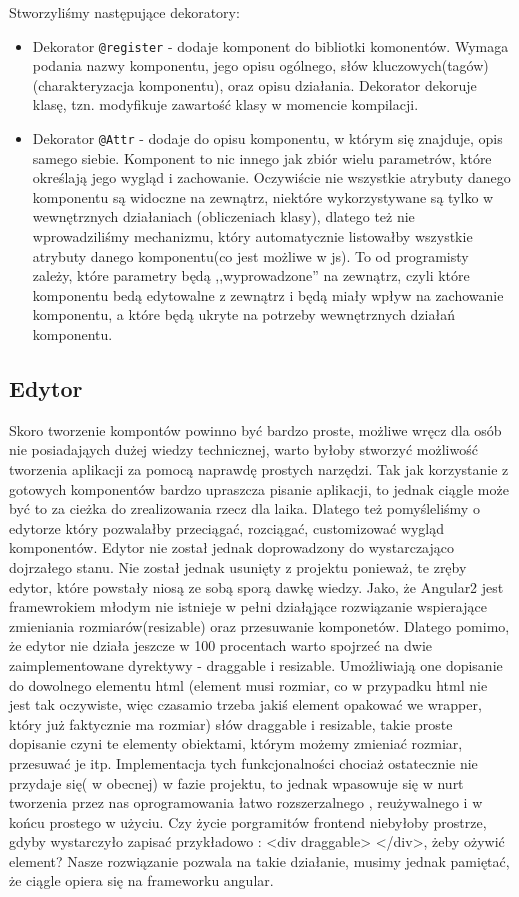\documentclass[licencjacka]{pracamgr}
\begin{document}
Stworzyliśmy następujące dekoratory:
\begin{itemize}
	\item Dekorator \texttt{@register} - dodaje komponent do bibliotki komonentów. Wymaga podania nazwy komponentu,
jego opisu ogólnego, słów kluczowych(tagów) (charakteryzacja komponentu),
oraz opisu działania. Dekorator dekoruje klasę, tzn. modyfikuje zawartość
klasy w momencie kompilacji.

	\item Dekorator \texttt{@Attr} - dodaje do opisu komponentu, w którym się znajduje, opis samego siebie.
Komponent to nic innego jak zbiór wielu parametrów, które określają jego wygląd i zachowanie.
Oczywiście nie wszystkie atrybuty danego komponentu są widoczne na zewnątrz, niektóre wykorzystywane
są tylko w wewnętrznych działaniach (obliczeniach klasy), dlatego też nie wprowadziliśmy mechanizmu, który
automatycznie listowałby wszystkie atrybuty danego komponentu(co jest możliwe w js). To od programisty
zależy, które parametry będą ,,wyprowadzone'' na zewnątrz, czyli które komponentu bedą edytowalne z zewnątrz
i będą miały wpływ na zachowanie komponentu, a które będą ukryte na potrzeby wewnętrznych działań komponentu.
\end{itemize}

\subsection{Edytor}
Skoro tworzenie kompontów powinno być bardzo proste, możliwe wręcz dla osób nie posiadająych dużej wiedzy technicznej, warto byłoby
stworzyć możliwość tworzenia aplikacji za pomocą naprawdę prostych narzędzi. Tak jak korzystanie z gotowych komponentów
bardzo upraszcza pisanie aplikacji, to jednak ciągle może być to za cieżka do zrealizowania rzecz dla laika. Dlatego też pomyśleliśmy
o edytorze który pozwalałby przeciągać, rozciągać, customizować wygląd komponentów. Edytor nie został jednak doprowadzony do wystarczająco dojrzałego
stanu. Nie został jednak usunięty z projektu ponieważ, te zręby edytor, które powstały niosą ze sobą sporą dawkę wiedzy. Jako, że Angular2
jest framewrokiem młodym nie istnieje w pełni działąjące rozwiązanie wspierające zmieniania rozmiarów(resizable) oraz przesuwanie komponetów.
Dlatego pomimo, że edytor nie działa jeszcze w 100 procentach warto spojrzeć na dwie zaimplementowane dyrektywy - draggable i resizable.
Umożliwiają one dopisanie do dowolnego elementu html (element musi rozmiar, co w przypadku html nie jest tak oczywiste, więc czasamio trzeba
jakiś element opakować we wrapper, który już faktycznie ma rozmiar) słów draggable i resizable, takie proste dopisanie czyni te elementy
obiektami, którym możemy zmieniać rozmiar, przesuwać je itp. Implementacja tych funkcjonalności chociaż ostatecznie nie przydaje się( w obecnej) w fazie projektu,
to jednak wpasowuje się w nurt tworzenia przez nas oprogramowania łatwo rozszerzalnego , reużywalnego i w końcu prostego w użyciu. Czy życie porgramitów
frontend niebyłoby prostrze, gdyby wystarczyło zapisać przykładowo : <div draggable> </div>, żeby ożywić element? Nasze rozwiązanie pozwala na takie działanie,
musimy jednak pamiętać, że ciągle opiera się na frameworku angular.
\end{document}
